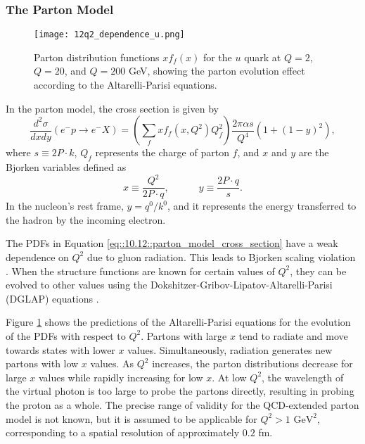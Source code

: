 \subsubsection{The Parton Model}
\label{10.12::parton_model}
    \begin{figure}[t!]
        \texttt{[image: 12q2\_dependence\_u.png]}
        \caption[$Q^2$ dependence of $x$ PDF for the $u$ quark.]
        {Parton distribution functions $xf_f(x)$ for the $u$ quark at $Q = 2$, $Q = 20$, and $Q = 200$ GeV, showing the parton evolution effect according to the Altarelli-Parisi equations.}
        \label{fig::10.12::q2_dependence}
    \end{figure}

    In the parton model, the cross section is given by
    \begin{equation}
        \frac{d^2\sigma}{dxdy} \left( e^-p \rightarrow e^-X \right) =
            \left( \sum_f xf_f \left( x, Q^2 \right) Q_f^2 \right)
            \frac{2\pi\alpha s}{Q^4} \left( 1 + \left( 1 - y \right)^2 \right),
        \label{eq::10.12::parton_model_cross_section}
    \end{equation}
    where $s \equiv 2P\cdot k$, $Q_f$ represents the charge of parton $f$, and $x$ and $y$ are the Bjorken variables defined as
    \begin{equation*}
        x \equiv \frac{Q^2}{2P\cdot q}, \hspace{36pt} y \equiv \frac{2 P\cdot q}{s}.
    \end{equation*}
    In the nucleon's rest frame, $y = q^0/k^0$, and it represents the energy transferred to the hadron by the incoming electron.

    The PDFs in Equation \eqref{eq::10.12::parton_model_cross_section} have a weak dependence on $Q^2$ due to gluon radiation.
    This leads to Bjorken scaling violation \cite{halzen1991}.
    When the structure functions are known for certain values of $Q^2$, they can be evolved to other values using the Dokshitzer-Gribov-Lipatov-Altarelli-Parisi (DGLAP) equations \cite{dokshitzer1991}.

    Figure \ref{fig::10.12::q2_dependence} shows the predictions of the Altarelli-Parisi equations for the evolution of the PDFs with respect to $Q^2$.
    Partons with large $x$ tend to radiate and move towards states with lower $x$ values.
    Simultaneously, radiation generates new partons with low $x$ values.
    As $Q^2$ increases, the parton distributions decrease for large $x$ values while rapidly increasing for low $x$.
    At low $Q^2$, the wavelength of the virtual photon is too large to probe the partons directly, resulting in probing the proton as a whole.
    The precise range of validity for the QCD-extended parton model is not known, but it is assumed to be applicable for $Q^2 > 1 \text{ GeV}^2$, corresponding to a spatial resolution of approximately $0.2$ fm.

